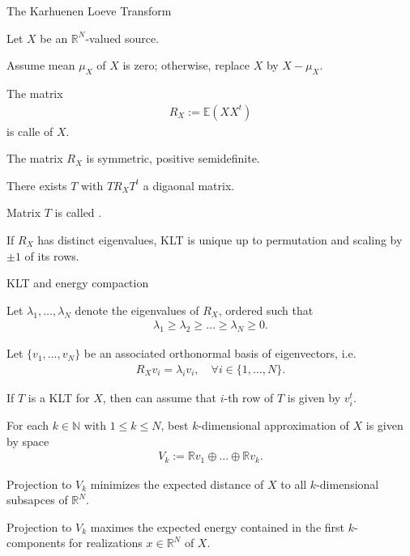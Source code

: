 \begin{frame}{The Karhuenen Loeve Transform}
\bit
\item Let $X$ be an $\mathbb{R}^N$-valued source.
\item Assume mean $\mu_X$ of $X$ is zero; otherwise, replace $X$ by $X-\mu_X$. 
\item The matrix 
\begin{align*}
R_X:=\mathbb{E}(XX^t)
\end{align*} 
is calle  of $X$. 
\item The matrix $R_X$ is symmetric, positive semidefinite.
\item[\iarrow] There exists  $T$ with $TR_XT^{t}$ a digaonal matrix.
\item Matrix $T$ is called .
\item If $R_X$ has distinct eigenvalues, KLT is unique up to permutation and scaling by $\pm 1$ of its rows. 
\eit
\end{frame}

\begin{frame}{KLT and energy compaction} 
\bit
\item Let $\lambda_1,\dots,\lambda_N$ denote the eigenvalues of $R_X$, ordered such that 
\begin{align*}
\lambda_1\geq \lambda_2\geq\dots\geq \lambda_N\geq 0.
\end{align*}
\item Let $\{v_1,\dots,v_N\}$ be an associated orthonormal basis of eigenvectors, i.e. 
\begin{align*}
R_Xv_i=\lambda_i v_i, \quad \forall i\in\{1,\dots,N\}. 
\end{align*}
\item[\iarrow] If $T$ is a KLT for $X$, then can assume that $i$-th row of $T$ is given by $v_i^t$. 
\eit

\bit
\item For each $k\in\mathbb{N}$ with $1\leq k\leq N$, best $k$-dimensional approximation of $X$ is given by space
\begin{align*}
V_k:=\mathbb{R}v_1\oplus\dots\oplus\mathbb{R}v_k. 
\end{align*}
\item[\iarrow] Projection to $V_k$ minimizes the expected distance of $X$ to all 
$k$-dimensional subsapces of $\mathbb{R}^N$. 
\item[\iarrow] Projection to $V_k$ maximes the expected energy contained in the first $k$-components for realizations $x\in\mathbb{R}^N$ of $X$. 
\eit
\end{frame}

